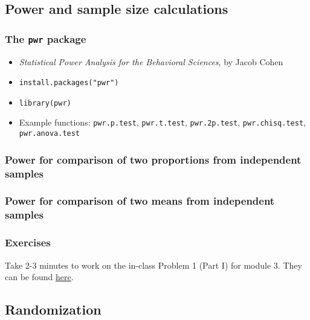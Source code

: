 \documentclass{beamer}
\begin{document}
\subsection{Power and sample size calculations}

\begin{frame}
    \frametitle{The \texttt{pwr} package}
    \begin{itemize}
      \item \emph{Statistical Power Analysis for the Behavioral Sciences}, by Jacob Cohen
      \pause
      \item \texttt{install.packages("pwr")}
      \pause
      \item \texttt{library(pwr)}
      \pause
      \item Example functions: \texttt{pwr.p.test},
            \texttt{pwr.t.test}, \texttt{pwr.2p.test},
            \texttt{pwr.chisq.test}, \texttt{pwr.anova.test}
    \end{itemize}
\end{frame}


\begin{frame}[fragile]
    \frametitle{Power for comparison of two proportions from independent samples}
    \fontsize{10}{12}\selectfont
    
\end{frame}


\begin{frame}[fragile]
    \frametitle{Power for comparison of two means from independent samples}
    \fontsize{10}{12}\selectfont
    
\end{frame}


\begin{frame}
    \frametitle{Exercises}
    Take 2-3 minutes to work on the in-class Problem 1 (Part I) for module 3.
    They can be found \href{https://github.com/rnitulescu/RcourseOncology2021/blob/master/exercises3.R}{here}.
\end{frame}



\subsection{Randomization}
\end{document}
